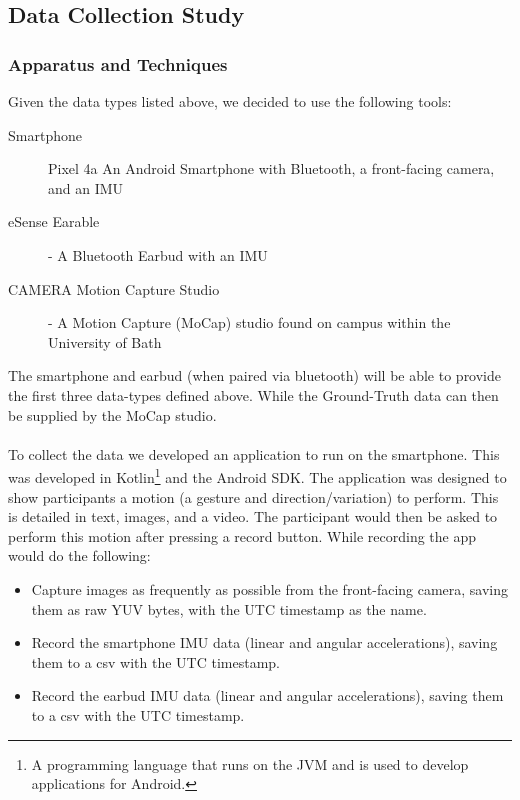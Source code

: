 \subsection{Data Collection Study} %


\subsubsection{Apparatus and Techniques}\nl
Given the data types listed above, we decided to use the following tools:
\begin{description}
    \item[Smartphone]\nl Pixel 4a
    An Android Smartphone with Bluetooth, a front-facing camera, and an IMU
    \item[eSense Earable] - A Bluetooth Earbud with an IMU
    \item[CAMERA Motion Capture Studio]\nl - A Motion Capture (MoCap) studio found on campus within the University of Bath
\end{description}
The smartphone and earbud (when paired via bluetooth) will be able to provide the first three data-types defined above. While the Ground-Truth data can then be supplied by the MoCap studio.
\\\\
To collect the data we developed an application to run on the smartphone. 
This was developed in Kotlin\footnote{A programming language that runs on the JVM and is used to develop applications for Android.} and the Android SDK.
The application was designed to show participants a motion (a gesture and direction/variation) to perform. This is detailed in text, images, and a video. 
The participant would then be asked to perform this motion after pressing a record button. While recording the app would do the following:
\begin{itemize}
    \item Capture images as frequently as possible from the front-facing camera, saving them as raw YUV bytes, with the UTC timestamp as the name.
    \item Record the smartphone IMU data (linear and angular accelerations), saving them to a csv with the UTC timestamp.
    \item Record the earbud IMU data (linear and angular accelerations), saving them to a csv with the UTC timestamp.
\end{itemize}
